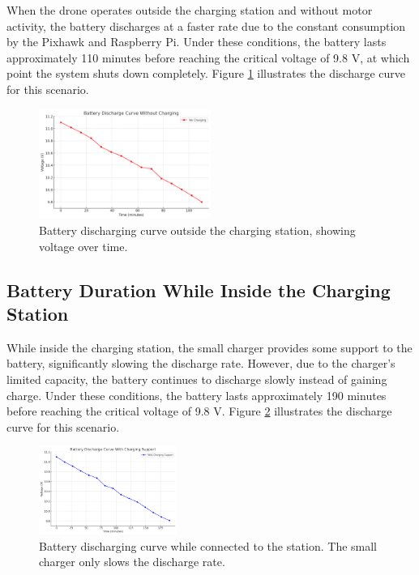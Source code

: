 When the drone operates outside the charging station and without motor activity, the battery discharges at a faster rate due to the constant consumption by the Pixhawk and Raspberry Pi. Under these conditions, the battery lasts approximately 110 minutes before reaching the critical voltage of 9.8 V, at which point the system shuts down completely. Figure \ref{fig:battery_charging_curve} illustrates the discharge curve for this scenario.

\begin{figure}[H]
    \centering
    \includegraphics[width=0.5\textwidth]{pictures/Battery_Discharge_Outside.png}
    \caption{Battery discharging curve outside the charging station, showing voltage over time.}
    \label{fig:battery_charging_curve}
\end{figure}

\subsection{Battery Duration While Inside the Charging Station}

While inside the charging station, the small charger provides some support to the battery, significantly slowing the discharge rate. However, due to the charger’s limited capacity, the battery continues to discharge slowly instead of gaining charge. Under these conditions, the battery lasts approximately 190 minutes before reaching the critical voltage of 9.8 V. Figure \ref{fig:battery_discharge_curve} illustrates the discharge curve for this scenario.

\begin{figure}[H]
    \centering
    \includegraphics[width=0.4\textwidth]{pictures/Battery_Discharge_Inside.png}
    \caption{Battery discharging curve while connected to the station. The small charger only slows the discharge rate.}
    \label{fig:battery_discharge_curve}
\end{figure}

